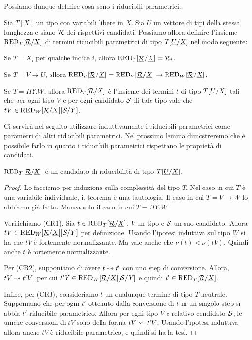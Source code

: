 \documentclass[]{marticle}
\begin{document}
Possiamo dunque definire cosa sono i riducibili parametrici:
\newcommand{\subrx}{\sub{\underline{\can{R}}}{\underline{X}}}
\begin{block} [Definizione]
    Sia $T[\underline{X}]$ un tipo con variabili libere in $\underline{X}$. Sia
    $\underline{U}$ un vettore di tipi della stessa lunghezza e siano $\mathcal{R}$
    dei rispettivi candidati. Possiamo allora definire l'insieme
    $\red{T}\subrx$ di termini riducibili parametrici di tipo
    $T[\underline{U}/\underline{X}]$ nel modo seguente:
    \begin{nlist} [1]
        \item  Se $T=X_i$ per qualche indice $i$, allora
            $\red{T}\subrx=\can{R}_i$.
        \item Se $T=V\rightarrow U$, allora $\red{T}\subrx = \red{V}\subrx
            \rightarrow \red{W}\subrx$.
        \item Se $T=\Pi Y.W$, allora $\red{T}\subrx$ \`e l'insieme dei termini
            $t$ di tipo $T[\underline{U}/\underline{X}]$ tali che per ogni
            tipo $V$ e per ogni candidato $\mathcal{S}$ di tale tipo vale che $tV
            \in \red{W}\subrx\sub{\can{S}}{Y}$.
    \end{nlist}
\end{block}

Ci servir\`a nel seguito utilizzare induttivamente i riducibili parametrici come
parametri di altri riducibili parametrici. Nel prossimo lemma dimostreremo che
\`e possibile farlo in quanto i riducibili parametrici rispettano le propriet\`a
di candidati.
\begin{block} [Lemma]
    $\red{T}\subrx$ \`e un candidato di riducibilit\`a di tipo
    $T[\underline{U}/\underline{X}]$.
\end{block}
\begin{proof}
    Lo facciamo per induzione sulla complessit\`a del tipo $T$. Nel caso in cui
    $T$ \`e una variabile individuale, il teorema \`e una tautologia. Il caso in
    cui $T=V\rightarrow W$ lo abbiamo gi\`a fatto. Manca solo il caso in cui
    $T=\Pi Y.W$. 

    Verifichiamo (CR1). Sia $t\in \red{T}\subrx$, $V$ un tipo e $\mathcal{S}$ un suo
    candidato. Allora $tV \in \red{W}\subrx\sub{\can{S}}{Y}$ per definizione.
    Usando l'ipotesi induttiva sul tipo $W$ si ha che $tV$ \`e fortemente
    normalizzante. Ma vale anche che $\nu(t)<\nu(tV)$. Quindi anche $t$ \`e
    fortemente normalizzante. 

    Per (CR2), supponiamo di avere $t\rightsquigarrow t'$ con uno step di conversione.
    Allora, $tV\rightsquigarrow t'V$, per cui $t'V \in \red{W}\subrx\sub{\can{S}}{Y}$ e
    quindi $t'\in \red{T}\subrx$.

    Infine, per (CR3), consideriamo $t$ un qualunque termine di tipo $T$
    neutrale. Supponiamo che per ogni $t'$ ottenuto dalla conversione di $t$ in
    un singolo step si abbia $t'$ riducibile parametrico. Allora per ogni tipo
    $V$ e relativo condidato $\mathcal{S}$, le uniche conversioni di $tV$ sono della
    forma $tV\rightsquigarrow t'V$. Usando l'ipotesi induttiva allora anche $tV$ \`e
    riducibile parametrico, e quindi si ha la tesi.
\end{proof}
\end{document}
